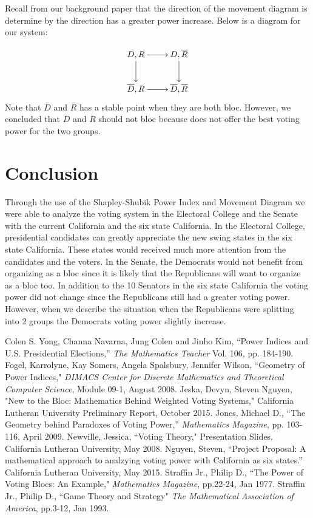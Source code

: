 \documentclass[12pt]{article}
\begin{document}
\newpage Recall from our background paper that the direction of the movement diagram is determine by the direction has a greater power increase. Below is a diagram for our system:

\begin{displaymath}
 \xymatrix{ D,R \ar[r]  \ar[d]
 & D,\overline{R} \ar[d] \\
 \overline{D},R \ar[r] &  \overline{D},\overline{R} }
\end{displaymath}
Note that $\bar{D}$ and $\bar{R}$ has a stable point when they are both bloc. However, we concluded that $\bar{D}$ and $\bar{R}$ should not bloc because does not offer the best voting power for the two groups. 
\section{Conclusion}
Through the use of the Shapley-Shubik Power Index and Movement Diagram we were able to analyze the voting system in the Electoral College and the Senate with the current California and the six state California. In the Electoral College, presidential candidates can greatly appreciate the new swing states in the six state California. These states would received much more attention from the candidates and the voters. In the Senate, the Democrats would not benefit from organizing as a bloc since it is likely that the Republicans will want to organize as a bloc too. In addition to the 10 Senators in the six state California the voting power did not change since the Republicans still had a greater voting power. However, when we describe the situation when the Republicans were splitting into 2 groups the Democrats voting power slightly increase. 

\begin{thebibliography}{10}
 Colen S. Yong, Channa Navarna, Jung Colen and Jinho Kim, ``Power Indices and U.S. Presidential Elections,'' \emph{The Mathematics Teacher} Vol. 106, pp. 184-190.
 Fogel, Karrolyne, Kay Somers, Angela Spalsbury, Jennifer Wilson, ``Geometry of Power Indices," \emph{DIMACS Center for Discrete Mathematics and Theoretical Computer Science}, Module 09-1, August 2008.
 Jeska, Devyn, Steven Nguyen, "New to the Bloc: Mathematics Behind Weighted Voting Systems," California Lutheran University Preliminary Report, October 2015.
 Jones, Michael D., ``The Geometry behind Paradoxes of Voting Power,'' \emph{Mathematics Magazine}, pp. 103-116, April 2009.
 Newville, Jessica, ``Voting Theory," Presentation Slides. California Lutheran University, May 2008.
 Nguyen, Steven, ``Project Proposal: A mathematical approach to analzying voting power with California as six states.'' California Lutheran University, May 2015.
 Straffin Jr., Philip D., ``The Power of Voting Blocs: An Example," \emph{Mathematics Magazine}, pp.22-24, Jan 1977.
 Straffin Jr., Philip D., ``Game Theory and Strategy" \emph{The Mathematical Association of America}, pp.3-12, Jan 1993.
\end{thebibliography}
\end{document}
